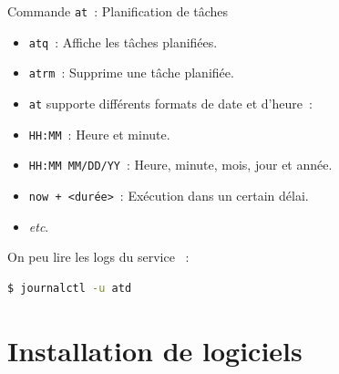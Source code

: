 \documentclass{beamer}
\begin{document}
    \begin{frame}[fragile]{Commande \lstinline{at}~: Planification de tâches}
        \begin{itemize}
            \item \lstinline{atq}~: Affiche les tâches planifiées.
            \item \lstinline{atrm}~: Supprime une tâche planifiée.
            \item \lstinline{at} supporte différents formats de date et d'heure~:
            \item \lstinline{HH:MM}~: Heure et minute.
            \item \lstinline{HH:MM MM/DD/YY}~: Heure, minute, mois, jour et année.
            \item \lstinline{now + <durée>}~: Exécution dans un certain délai.
            \item \textit{etc}.
        \end{itemize}
        On peu lire les logs du service \lstinline{}~:
        \begin{lstlisting}[language=bash]
$ journalctl -u atd
        \end{lstlisting}
    \end{frame}


    \section{Installation de logiciels}\label{sec:installation}
\end{document}

